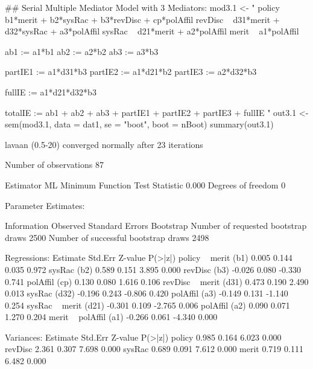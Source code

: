 \begin{Schunk}
\begin{Sinput}
 ## Serial Multiple Mediator Model with 3 Mediators:
 mod3.1 <- "
 policy ~ b1*merit + b2*sysRac + b3*revDisc + cp*polAffil
 revDisc ~ d31*merit + d32*sysRac + a3*polAffil
 sysRac ~ d21*merit + a2*polAffil
 merit ~ a1*polAffil
 
 ab1 := a1*b1
 ab2 := a2*b2
 ab3 := a3*b3
 
 partIE1 := a1*d31*b3
 partIE2 := a1*d21*b2
 partIE3 := a2*d32*b3
 
 fullIE := a1*d21*d32*b3
 
 totalIE := ab1 + ab2 + ab3 + partIE1 + partIE2 + partIE3 + fullIE 
 "
 out3.1 <- 
     sem(mod3.1, data = dat1, se = "boot", boot = nBoot)
 summary(out3.1)
\end{Sinput}
\begin{Soutput}
lavaan (0.5-20) converged normally after  23 iterations

  Number of observations                            87

  Estimator                                         ML
  Minimum Function Test Statistic                0.000
  Degrees of freedom                                 0

Parameter Estimates:

  Information                                 Observed
  Standard Errors                            Bootstrap
  Number of requested bootstrap draws             2500
  Number of successful bootstrap draws            2498

Regressions:
                   Estimate  Std.Err  Z-value  P(>|z|)
  policy ~                                            
    merit     (b1)    0.005    0.144    0.035    0.972
    sysRac    (b2)    0.589    0.151    3.895    0.000
    revDisc   (b3)   -0.026    0.080   -0.330    0.741
    polAffil  (cp)    0.130    0.080    1.616    0.106
  revDisc ~                                           
    merit    (d31)    0.473    0.190    2.490    0.013
    sysRac   (d32)   -0.196    0.243   -0.806    0.420
    polAffil  (a3)   -0.149    0.131   -1.140    0.254
  sysRac ~                                            
    merit    (d21)   -0.301    0.109   -2.765    0.006
    polAffil  (a2)    0.090    0.071    1.270    0.204
  merit ~                                             
    polAffil  (a1)   -0.266    0.061   -4.340    0.000

Variances:
                   Estimate  Std.Err  Z-value  P(>|z|)
    policy            0.985    0.164    6.023    0.000
    revDisc           2.361    0.307    7.698    0.000
    sysRac            0.689    0.091    7.612    0.000
    merit             0.719    0.111    6.482    0.000


\end{Soutput}
\end{Schunk}
